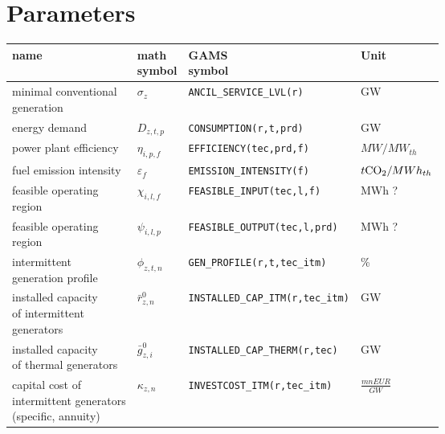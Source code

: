 \documentclass[11pt,a4paper]{article}
\begin{document}
\section{Parameters} \label{parameters}
\begin{tabular}{l l l l}
\textbf{name} & \makecell[l]{\textbf{math} \\ \textbf{symbol}} & \makecell[l]{\textbf{GAMS} \\\textbf{symbol}} & \textbf{Unit} \\
\hline \hline
\makecell[l]{minimal conventional \\generation} & $\sigma_{z}$ & \texttt{ANCIL\_SERVICE\_LVL(r)} & GW \\ \hline
energy demand & $D_{z,t,p}$ & \texttt{CONSUMPTION(r,t,prd)} & GW \\ \hline
power plant efficiency & $\eta_{i,p,f}$ & \texttt{EFFICIENCY(tec,prd,f)} & $MW / MW_{th}$\\ \hline
fuel emission intensity & $\varepsilon_{f}$ & \texttt{EMISSION\_INTENSITY(f)} & $t \ce{CO2}/MWh_{th}$\\ \hline
\makecell[l]{feasible operating \\region} & $\chi_{i,l,f}$ & \texttt{FEASIBLE\_INPUT(tec,l,f)} & MWh ? \\ \hline
\makecell[l]{feasible operating \\region} & $\psi_{i,l,p}$ & \texttt{FEASIBLE\_OUTPUT(tec,l,prd)} & MWh ? \\ \hline
\makecell[l]{intermittent \\generation profile} & $\phi_{z,t,n}$ & \texttt{GEN\_PROFILE(r,t,tec\_itm)} & \% \\ \hline
\makecell[l]{installed capacity \\of intermittent \\generators} & $\bar{r}^{0}_{z,n}$ & \texttt{INSTALLED\_CAP\_ITM(r,tec\_itm)} & GW \\ \hline
\makecell[l]{installed capacity \\of thermal generators} & $\bar{g}^{0}_{z,i}$ & \texttt{INSTALLED\_CAP\_THERM(r,tec)} & GW \\ \hline
\makecell[l]{capital cost of \\intermittent generators \\(specific, annuity)} & $\kappa_{z,n}$ & \texttt{INVESTCOST\_ITM(r,tec\_itm)} & $\frac{mn EUR}{GW}$ \\ \hline

\end{tabular}
\end{document}
